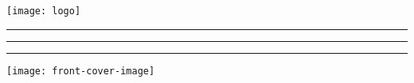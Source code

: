 \documentclass{minimal}
\newlength{\coverheight}
\newlength{\coverwidth}
\newlength{\coverthickness}
\newlength{\realtextwidth}
\newlength{\realtextheight}
\begin{document}
\noindent
\parbox[b][\coverheight][c]{\coverwidth}{
\hfill
\parbox[c][\realtextheight][c]{\realtextwidth}{
\setlength{\parskip}{\baselineskip}

  

  \vfill

  \begin{center}
    \texttt{[image: logo]}
  \end{center}
}
\hfill\mbox{}
}%
\rule{1pt}{\coverheight}%
\parbox[b][\coverheight][c]{\coverthickness}{
\vfill
\begin{center}
\end{center}
\vfill
\begin{center}
\end{center}
\quad
}%
\parbox[b][\coverheight][c]{\coverwidth}{
\rule{1pt}{\coverheight}\hfill\rule{1mm}{\coverheight}
\texttt{[image: front-cover-image]}
}
\end{document}
